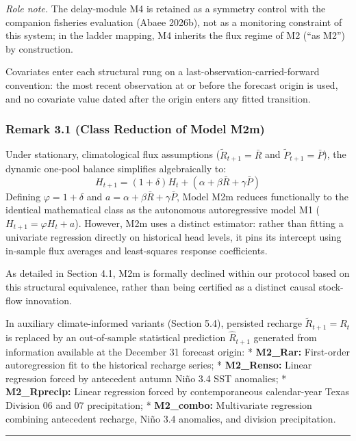 \documentclass[11pt]{article}
\begin{document}
\emph{Role note.} The delay-module M4 is retained as a symmetry control
with the companion fisheries evaluation (Abaee 2026b), not as a
monitoring constraint of this system; in the ladder mapping, M4 inherits
the flux regime of M2 (``as M2'') by construction.

Covariates enter each structural rung on a
last-observation-carried-forward convention: the most recent observation
at or before the forecast origin is used, and no covariate value dated
after the origin enters any fitted transition.

\subsubsection{Remark 3.1 (Class Reduction of Model
M2m)}\label{remark-3.1-class-reduction-of-model-m2m}

Under stationary, climatological flux assumptions
(\(\tilde{R}_{t+1} = \bar{R}\) and \(\tilde{P}_{t+1} = \bar{P}\)), the
dynamic one-pool balance simplifies algebraically to:
\[H_{t+1} = (1 + \delta) H_t + (\alpha + \beta \bar{R} + \gamma \bar{P})\]
Defining \(\varphi = 1 + \delta\) and
\(a = \alpha + \beta \bar{R} + \gamma \bar{P}\), Model M2m reduces
functionally to the identical mathematical class as the autonomous
autoregressive model M1 (\(H_{t+1} = \varphi H_t + a\)). However, M2m
uses a distinct estimator: rather than fitting a univariate regression
directly on historical head levels, it pins its intercept using
in-sample flux averages and least-squares response coefficients.

As detailed in Section 4.1, M2m is formally declined within our protocol
based on this structural equivalence, rather than being certified as a
distinct causal stock-flow innovation.

In auxiliary climate-informed variants (Section 5.4), persisted recharge
\(\tilde{R}_{t+1} = R_t\) is replaced by an out-of-sample statistical
prediction \(\hat{R}_{t+1}\) generated from information available at the
December 31 forecast origin: * \textbf{M2\_Rar:} First-order
autoregression fit to the historical recharge series; *
\textbf{M2\_Renso:} Linear regression forced by antecedent autumn Niño
3.4 SST anomalies; * \textbf{M2\_Rprecip:} Linear regression forced by
contemporaneous calendar-year Texas Division 06 and 07 precipitation; *
\textbf{M2\_combo:} Multivariate regression combining antecedent
recharge, Niño 3.4 anomalies, and division precipitation.

\begin{center}\rule{0.5\linewidth}{0.5pt}\end{center}
\end{document}
